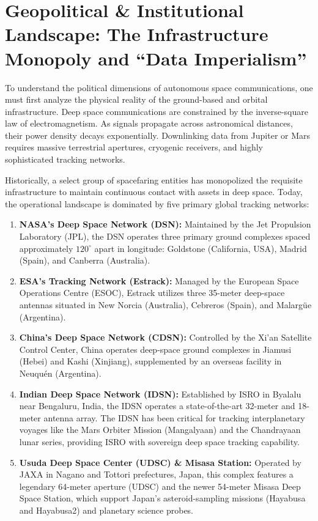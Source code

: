 \documentclass[final,5p,times,twocolumn]{elsarticle}
\begin{document}
\section{Geopolitical \& Institutional Landscape: The Infrastructure Monopoly and ``Data Imperialism''}
\label{sec:landscape}

To understand the political dimensions of autonomous space communications, one must first analyze the physical reality of the ground-based and orbital infrastructure. Deep space communications are constrained by the inverse-square law of electromagnetism. As signals propagate across astronomical distances, their power density decays exponentially. Downlinking data from Jupiter or Mars requires massive terrestrial apertures, cryogenic receivers, and highly sophisticated tracking networks. 

Historically, a select group of spacefaring entities has monopolized the requisite infrastructure to maintain continuous contact with assets in deep space. Today, the operational landscape is dominated by five primary global tracking networks:
\begin{enumerate}
\item \textbf{NASA's Deep Space Network (DSN):} Maintained by the Jet Propulsion Laboratory (JPL), the DSN operates three primary ground complexes spaced approximately $120^\circ$ apart in longitude: Goldstone (California, USA), Madrid (Spain), and Canberra (Australia).
\item \textbf{ESA's Tracking Network (Estrack):} Managed by the European Space Operations Centre (ESOC), Estrack utilizes three 35-meter deep-space antennas situated in New Norcia (Australia), Cebreros (Spain), and Malargüe (Argentina).
\item \textbf{China's Deep Space Network (CDSN):} Controlled by the Xi'an Satellite Control Center, China operates deep-space ground complexes in Jiamusi (Hebei) and Kashi (Xinjiang), supplemented by an overseas facility in Neuquén (Argentina).
\item \textbf{Indian Deep Space Network (IDSN):} Established by ISRO in Byalalu near Bengaluru, India, the IDSN operates a state-of-the-art 32-meter and 18-meter antenna array. The IDSN has been critical for tracking interplanetary voyages like the Mars Orbiter Mission (Mangalyaan) and the Chandrayaan lunar series, providing ISRO with sovereign deep space tracking capability.
\item \textbf{Usuda Deep Space Center (UDSC) \& Misasa Station:} Operated by JAXA in Nagano and Tottori prefectures, Japan, this complex features a legendary 64-meter aperture (UDSC) and the newer 54-meter Misasa Deep Space Station, which support Japan's asteroid-sampling missions (Hayabusa and Hayabusa2) and planetary science probes.
\end{enumerate}
\end{document}
